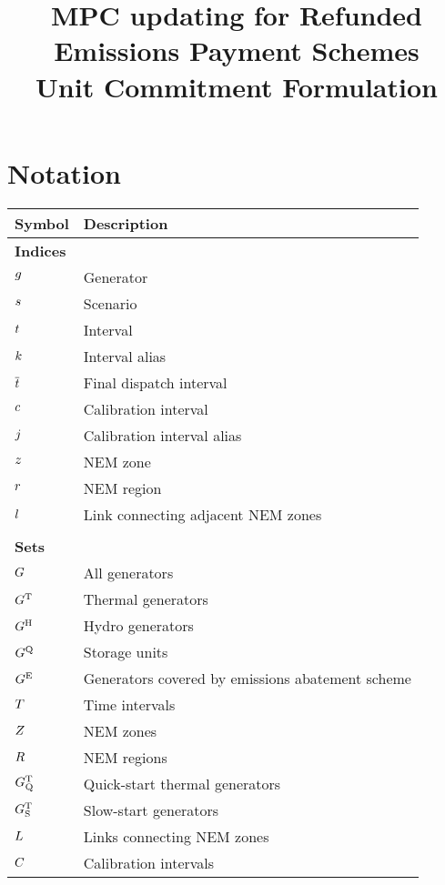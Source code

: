 \documentclass{article}
\title{MPC updating for Refunded Emissions Payment Schemes\\Unit Commitment Formulation}
\begin{document}
	\maketitle
	

\section{Notation}
\renewcommand*{\arraystretch}{1.3}
\begin{longtable}{ p{}  p{}}
	\textbf{Symbol} & \textbf{Description}\\
	\hline\hline
	\multicolumn{2}{l}{\textbf{Indices}}\\
	$g$ & Generator\\ 
	$s$ & Scenario\\
	$t$ & Interval\\
	$k$ & Interval alias\\
	$\overline{t}$ & Final dispatch interval\\
	$c$ & Calibration interval\\
	$j$ & Calibration interval alias\\
	$z$ & NEM zone\\
	$r$ & NEM region\\
	$l$ & Link connecting adjacent NEM zones\\
	& \\
	\multicolumn{2}{l}{\textbf{Sets}}\\
	$G$ & All generators\\
	$G^{\mathrm{T}}$ & Thermal generators\\
	$G^{\mathrm{H}}$ & Hydro generators\\
	$G^{\mathrm{Q}}$ & Storage units\\
	$G^{\mathrm{E}}$ & Generators covered by emissions abatement scheme\\
	$T$ & Time intervals\\
	$Z$ & NEM zones\\
	$R$ & NEM regions\\
	$G^{\mathrm{T}}_\mathrm{Q}$ & Quick-start thermal generators\\
	$G^{\mathrm{T}}_\mathrm{S}$ & Slow-start generators\\
	$L$ & Links connecting NEM zones\\
	$C$ & Calibration intervals\\

\end{longtable}
\end{document}
